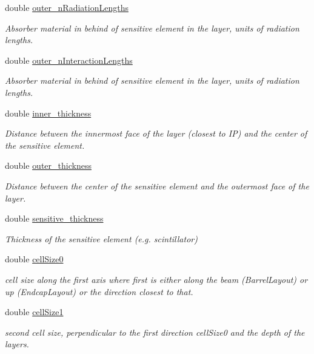 \begin{DoxyCompactItemize}
double \hyperlink{struct_d_d4hep_1_1_d_d_rec_1_1_layered_calorimeter_struct_1_1_layer_af46a77937ad8427edb903e291e5370fd}{outer\+\_\+n\+Radiation\+Lengths}
\begin{DoxyCompactList}\small\item\em Absorber material in behind of sensitive element in the layer, units of radiation lengths. \end{DoxyCompactList}\item 
double \hyperlink{struct_d_d4hep_1_1_d_d_rec_1_1_layered_calorimeter_struct_1_1_layer_abf4dac9dd33fe0ac0eeb033bd0daa420}{outer\+\_\+n\+Interaction\+Lengths}
\begin{DoxyCompactList}\small\item\em Absorber material in behind of sensitive element in the layer, units of radiation lengths. \end{DoxyCompactList}\item 
double \hyperlink{struct_d_d4hep_1_1_d_d_rec_1_1_layered_calorimeter_struct_1_1_layer_a93e6705275f50921dbc1d816bcbd5f73}{inner\+\_\+thickness}
\begin{DoxyCompactList}\small\item\em Distance between the innermost face of the layer (closest to IP) and the center of the sensitive element. \end{DoxyCompactList}\item 
double \hyperlink{struct_d_d4hep_1_1_d_d_rec_1_1_layered_calorimeter_struct_1_1_layer_aad0fde2a5b642bc6dd0ff6a08a594da0}{outer\+\_\+thickness}
\begin{DoxyCompactList}\small\item\em Distance between the center of the sensitive element and the outermost face of the layer. \end{DoxyCompactList}\item 
double \hyperlink{struct_d_d4hep_1_1_d_d_rec_1_1_layered_calorimeter_struct_1_1_layer_af1137d1b807db356fee6095e24aa5cea}{sensitive\+\_\+thickness}
\begin{DoxyCompactList}\small\item\em Thickness of the sensitive element (e.\+g. scintillator) \end{DoxyCompactList}\item 
double \hyperlink{struct_d_d4hep_1_1_d_d_rec_1_1_layered_calorimeter_struct_1_1_layer_a648ec7174a8858e289b87214835d2fbf}{cell\+Size0}
\begin{DoxyCompactList}\small\item\em cell size along the first axis where first is either along the beam (Barrel\+Layout) or up (Endcap\+Layout) or the direction closest to that. \end{DoxyCompactList}\item 
double \hyperlink{struct_d_d4hep_1_1_d_d_rec_1_1_layered_calorimeter_struct_1_1_layer_afbf7fe6d692de53e93a654dbdd8a866a}{cell\+Size1}
\begin{DoxyCompactList}\small\item\em second cell size, perpendicular to the first direction cell\+Size0 and the depth of the layers. \end{DoxyCompactList}\end{DoxyCompactItemize}



